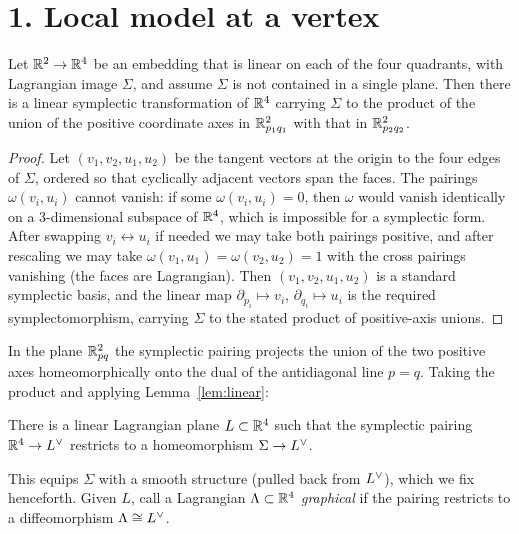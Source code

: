 \section*{1. Local model at a vertex}

\begin{qeightlemma}\label{lem:linear}
Let $\mathbb{R}^2\to\mathbb{R}^4$ be an embedding that is linear on each of the four quadrants,
with Lagrangian image $\Sigma$, and assume $\Sigma$ is not contained in a single
plane. Then there is a linear symplectic transformation of $\mathbb{R}^4$ carrying
$\Sigma$ to the product of the union of the positive coordinate axes in
$\mathbb{R}^2_{p_1q_1}$ with that in $\mathbb{R}^2_{p_2q_2}$.
\end{qeightlemma}

\begin{proof}
Let $(v_1,v_2,u_1,u_2)$ be the tangent vectors at the origin to the four edges of
$\Sigma$, ordered so that cyclically adjacent vectors span the faces. The
pairings $\omega(v_i,u_i)$ cannot vanish: if some $\omega(v_i,u_i)=0$, then
$\omega$ would vanish identically on a $3$-dimensional subspace of $\mathbb{R}^4$, which
is impossible for a symplectic form. After swapping $v_i\leftrightarrow u_i$ if
needed we may take both pairings positive, and after rescaling we may take
$\omega(v_1,u_1)=\omega(v_2,u_2)=1$ with the cross pairings vanishing (the faces
are Lagrangian). Then $(v_1,v_2,u_1,u_2)$ is a standard symplectic basis, and the
linear map $\partial_{p_i}\mapsto v_i$, $\partial_{q_i}\mapsto u_i$ is the
required symplectomorphism, carrying $\Sigma$ to the stated product of
positive-axis unions.
\end{proof}

In the plane $\mathbb{R}^2_{pq}$ the symplectic pairing projects the union of the two
positive axes homeomorphically onto the dual of the antidiagonal line $p=q$.
Taking the product and applying Lemma~\ref{lem:linear}:

\begin{qeightcorollary}\label{cor:Ldual}
There is a linear Lagrangian plane $L\subset\mathbb{R}^4$ such that the symplectic
pairing $\mathbb{R}^4\to L^{\vee}$ restricts to a homeomorphism $\Sigma\to L^{\vee}$.
\end{qeightcorollary}

This equips $\Sigma$ with a smooth structure (pulled back from $L^{\vee}$), which
we fix henceforth. Given $L$, call a Lagrangian $\Lambda\subset\mathbb{R}^4$
\emph{graphical} if the pairing restricts to a diffeomorphism $\Lambda\cong L^{\vee}$.

